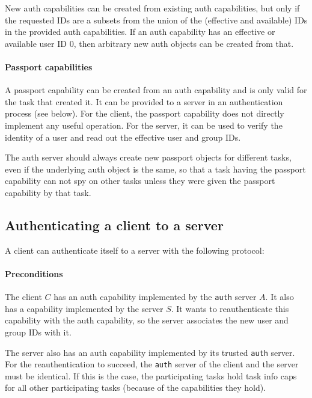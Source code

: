 New auth capabilities can be created from existing auth capabilities,
but only if the requested IDs are a subsets from the union of the
(effective and available) IDs in the provided auth capabilities.  If
an auth capability has an effective or available user ID 0, then
arbitrary new auth objects can be created from that.

\paragraph{Passport capabilities}
A passport capability can be created from an auth capability and is
only valid for the task that created it.  It can be provided to a
server in an authentication process (see below).  For the client, the
passport capability does not directly implement any useful operation.
For the server, it can be used to verify the identity of a user and
read out the effective user and group IDs.

The auth server should always create new passport objects for
different tasks, even if the underlying auth object is the same, so
that a task having the passport capability can not spy on other tasks
unless they were given the passport capability by that task.

\subsection{Authenticating a client to a server}

A client can authenticate itself to a server with the following
protocol:

\paragraph{Preconditions}
The client $C$ has an auth capability implemented by the \texttt{auth}
server $A$.  It also has a capability implemented by the server $S$.
It wants to reauthenticate this capability with the auth capability,
so the server associates the new user and group IDs with it.

The server also has an auth capability implemented by its trusted
\texttt{auth} server.  For the reauthentication to succeed, the
\texttt{auth} server of the client and the server must be identical.
If this is the case, the participating tasks hold task info caps for
all other participating tasks (because of the capabilities they hold).

